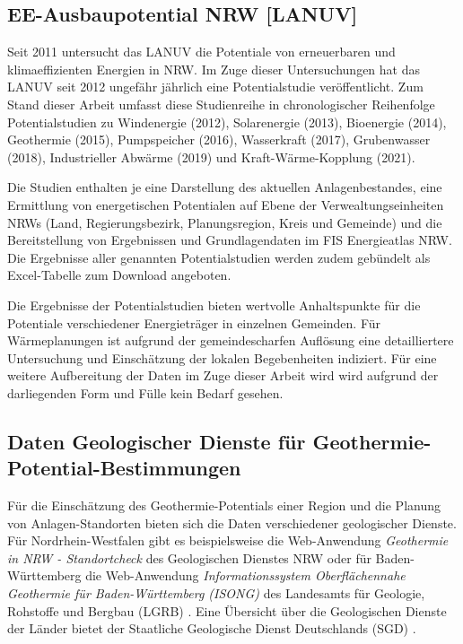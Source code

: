 		\subsection{EE-Ausbaupotential NRW [LANUV]}
			Seit 2011 untersucht das LANUV die Potentiale von erneuerbaren und klimaeffizienten Energien in NRW. Im Zuge dieser Untersuchungen hat das LANUV seit 2012 ungefähr jährlich eine Potentialstudie veröffentlicht. Zum Stand dieser Arbeit umfasst diese Studienreihe in chronologischer Reihenfolge Potentialstudien zu Windenergie (2012), Solarenergie (2013), Bioenergie (2014), Geothermie (2015), Pumpspeicher (2016), Wasserkraft (2017), Grubenwasser (2018), Industrieller Abwärme (2019) und Kraft-Wärme-Kopplung (2021). 
			
			Die Studien enthalten je eine Darstellung des aktuellen Anlagenbestandes, eine Ermittlung von energetischen Potentialen auf Ebene der Verwealtungseinheiten NRWs (Land, Regierungsbezirk, Planungsregion, Kreis und Gemeinde) und die Bereitstellung von Ergebnissen und Grundlagendaten im FIS Energieatlas NRW. Die Ergebnisse aller genannten Potentialstudien werden zudem gebündelt als Excel-Tabelle zum Download angeboten. \cite{web_energieatlas}
			
			Die Ergebnisse der Potentialstudien bieten wertvolle Anhaltspunkte für die Potentiale verschiedener Energieträger in einzelnen Gemeinden. Für Wärmeplanungen ist aufgrund der gemeindescharfen Auflösung eine detailliertere Untersuchung und Einschätzung der lokalen Begebenheiten indiziert. Für eine weitere Aufbereitung der Daten im Zuge dieser Arbeit wird wird aufgrund der darliegenden Form und Fülle kein Bedarf gesehen. 
			
		\subsection{Daten Geologischer Dienste für Geothermie-Potential-Bestimmungen}
			Für die Einschätzung des Geothermie-Potentials einer Region und die Planung von Anlagen-Standorten bieten sich die Daten verschiedener geologischer Dienste. Für Nordrhein-Westfalen gibt es beispielsweise die Web-Anwendung \textit{Geothermie in NRW - Standortcheck} des Geologischen Dienstes NRW oder für Baden-Württemberg die Web-Anwendung \textit{Informationssystem Oberflächennahe Geothermie für Baden-Württemberg (ISONG)} des Landesamts für Geologie, Rohstoffe und Bergbau (LGRB) \cite{web_geothermie_standortcheck_nrw} \cite{web_isong}. Eine Übersicht über die Geologischen Dienste der Länder bietet der Staatliche Geologische Dienst Deutschlands (SGD) \cite{web_sgd_geothermie}. 
						
